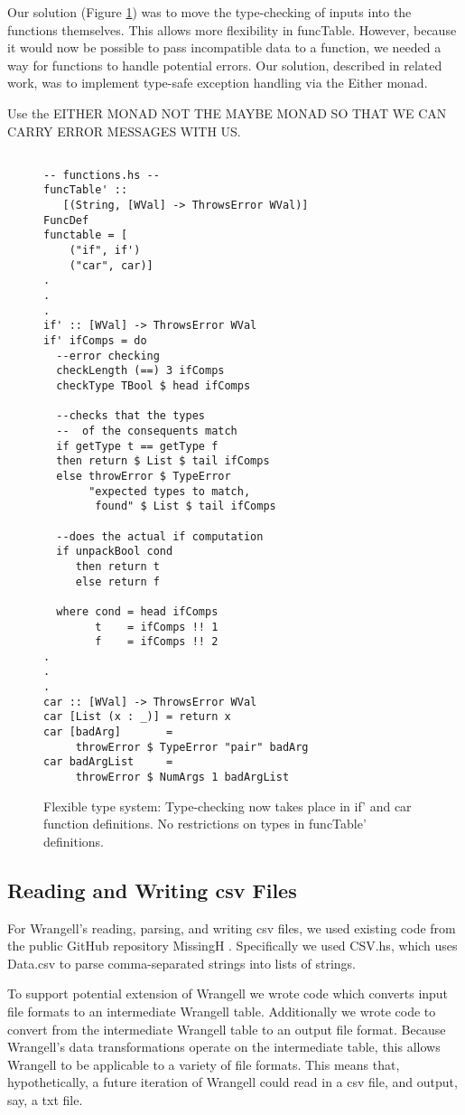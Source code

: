 \documentclass[preprint,nocopyrightspace]{sig-alternate}
\begin{document}
Our solution (Figure \ref{fig:flexType}) was to move the type-checking of inputs into the functions themselves. This allows more flexibility in funcTable. However, because it would now be possible to pass incompatible data to a function, we needed a way for functions to handle potential errors. Our solution, described in related work, was to implement type-safe exception handling via the Either monad. 

Use the EITHER MONAD NOT THE MAYBE MONAD SO THAT WE CAN CARRY ERROR MESSAGES WITH US. 

\begin{figure}
\caption{Flexible type system: Type-checking now takes place in if' and car function definitions. No restrictions on types in funcTable' definitions.}
\begin{lstlisting}

-- functions.hs --
funcTable' :: 
   [(String, [WVal] -> ThrowsError WVal)]
FuncDef
functable = [  
    ("if", if')
    ("car", car)]
.
.
.
if' :: [WVal] -> ThrowsError WVal 
if' ifComps = do
  --error checking
  checkLength (==) 3 ifComps
  checkType TBool $ head ifComps

  --checks that the types 
  --  of the consequents match
  if getType t == getType f
  then return $ List $ tail ifComps
  else throwError $ TypeError 
       "expected types to match, 
        found" $ List $ tail ifComps

  --does the actual if computation
  if unpackBool cond 
     then return t 
     else return f

  where cond = head ifComps
        t    = ifComps !! 1
        f    = ifComps !! 2
.
.
.
car :: [WVal] -> ThrowsError WVal
car [List (x : _)] = return x
car [badArg]       = 
     throwError $ TypeError "pair" badArg
car badArgList     = 
     throwError $ NumArgs 1 badArgList

\end{lstlisting} 
\label{fig:flexType}
\end{figure}

\subsection{Reading and Writing csv Files}
For Wrangell's reading, parsing, and writing csv files, we used  existing code from the public GitHub repository MissingH \cite{dataCSV}. Specifically we used CSV.hs, which uses Data.csv to parse comma-separated strings into lists of strings. 

To support potential extension of Wrangell we wrote code which converts input file formats to an intermediate Wrangell table. Additionally we wrote code to convert from the intermediate Wrangell table to an output file format. Because Wrangell's data transformations operate on the intermediate table, this allows Wrangell to be applicable to a variety of file formats. This means that, hypothetically, a future iteration of Wrangell could read in a csv file, and output, say, a txt file. 
\end{document}
